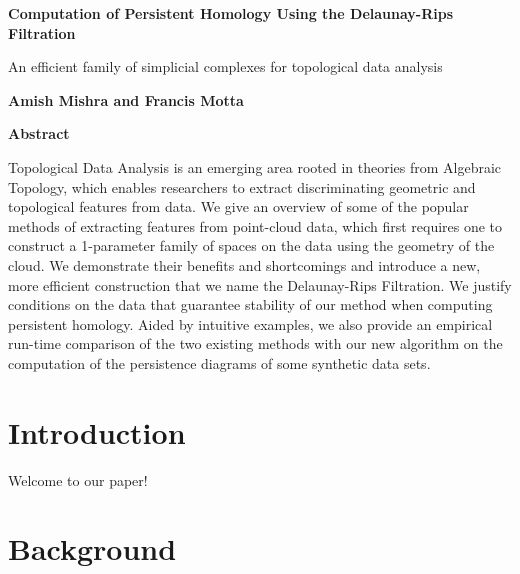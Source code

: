 \documentclass[letterpaper,titlepage]{article}
\begin{document}
\begin{center}
    \Large
    \textbf{Computation of Persistent Homology Using the Delaunay-Rips Filtration}
        
    \vspace{0.4cm}
    \large
    An efficient family of simplicial complexes for topological data analysis
        
    \vspace{0.4cm}
    \textbf{Amish Mishra and Francis Motta}
       
    \vspace{0.9cm}
    \textbf{Abstract}
\end{center}
Topological Data Analysis is an emerging area rooted in theories from Algebraic Topology, which enables researchers to extract discriminating geometric and topological features from data. We give an overview of some of the popular methods of extracting features from point-cloud data, which first requires one to construct a 1-parameter family of spaces on the data using the geometry of the cloud. We demonstrate their benefits and shortcomings and introduce a new, more efficient construction that we name the Delaunay-Rips Filtration. We justify conditions on the data that guarantee stability of our method when computing persistent homology. Aided by intuitive examples, we also provide an empirical run-time comparison of the two existing methods with our new algorithm on the computation of the persistence diagrams of some synthetic data sets.



\section{Introduction}
Welcome to our paper!

\section{Background}
\end{document}
